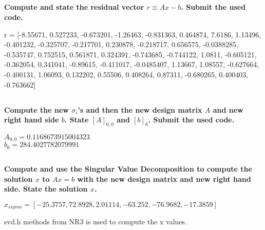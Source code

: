 \documentclass{article}
\begin{document}
\subsection{}
\textbf{Compute and state the residual vector $r \equiv Ax-b$. Submit the used code.}

r = [-8.55671, 0.527233, -0.673201, -1.26463, -0.831363, 0.464874, 7.6186, 1.13496, -0.401232, -0.325707, -0.217701, 0.230878, -0.218717, 0.656575, -0.0388285, -0.535747, 0.752515, 0.561871, 0.324391, -0.743685, -0.744122, 1.0811, -0.605121, -0.362054, 0.341041, -0.89615, -0.411017, -0.0485407, 1.13667, 1.08557, -0.627664, -0.400131, 1.06093, 0.132202, 0.55506, 0.408264, 0.87311, -0.680265, 0.400403, -0.763662]

\subsection{}
\textbf{Compute the new $\sigma_i$'s and then the new design matrix $A$ and new right hand side $b$. State $[A]_{0,0}$ and $[b]_6$. Submit the used code.}

$A_{0,0} = 0.1168673915004323$\\
$b_6=284.4027782079991$

\subsection{}
\textbf{Compute and use the Singular Value Decomposition to compute the solution $x$ to $Ax = b$ with the new design matrix and new right hand side. State the solution $x$.}

$x_{sigma} = [-25.3757, 72.8928, 2.01114, -63.252, -76.9682, -17.3859]$

svd.h methods from NR3 is used to compute the x values.
\end{document}
